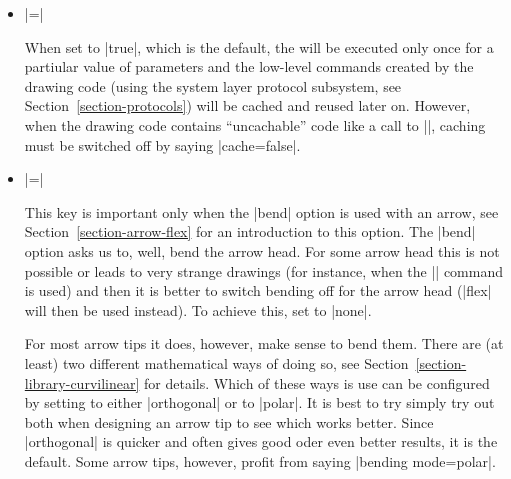 \begin{command}{\pgfdeclarearrow{}}
\begin{itemize}
    The are some special considerations concerning the :
    \begin{itemize}
    \item
      In the  you may \emph{not} use |\pgfusepath|
      since this would try to add arrow tips to the arrow tip and lead
      to a recursion. Use the ``quick'' versions |\pgfusepathqstroke|
      and so on instead, which never try to add arrow tips.
    \item
      If you stroke the path that you construct, you should first set
      the dashing to solid and set up fixed joins and caps, as
      needed. This will ensure that the arrow tip will always look the
      same.
    \item
      When the arrow tip code is executed, it is automatically put
      inside a low-level scope, so nothing will ``leak out'' from the
      scope.
    \item
      The high-level coordinate transformation matrix will be set to the
      identity matrix when the code is executed for the first time.
    \end{itemize}
    
  \item {}|=|

    When set to |true|, which is the default, the  will be
    executed only once for a partiular value of parameters and the
    low-level commands created by the drawing code (using the system
    layer protocol subsystem, see Section~\ref{section-protocols})
    will be cached and reused later on. However, when the drawing code
    contains ``uncachable'' code like a call to |\pgftext|, caching
    must be switched off by saying |cache=false|.

  \item {}|=|

    This key is important only when the |bend| option is used with an
    arrow, see Section~\ref{section-arrow-flex} for an introduction to
    this option. The |bend| option asks us to, well, bend the arrow
    head. For some arrow head this is not possible or leads to very
    strange drawings (for instance, when the |\pgftext| command is
    used) and then it is better to switch bending off for the arrow
    head (|flex| will then be used instead). To achieve this, set
     to |none|.

    For most arrow tips it does, however, make sense to bend
    them. There are (at least) two different mathematical ways of
    doing so, see Section~\ref{section-library-curvilinear} for details. Which of
    these ways is use can be configured by setting  to
    either |orthogonal| or to |polar|. It is best to try simply try
    out both when designing an arrow tip to see which works
    better. Since |orthogonal| is quicker and often gives good oder
    even better results, it is the default. Some arrow tips, however,
    profit from saying |bending mode=polar|.


\end{itemize}
\end{command}
